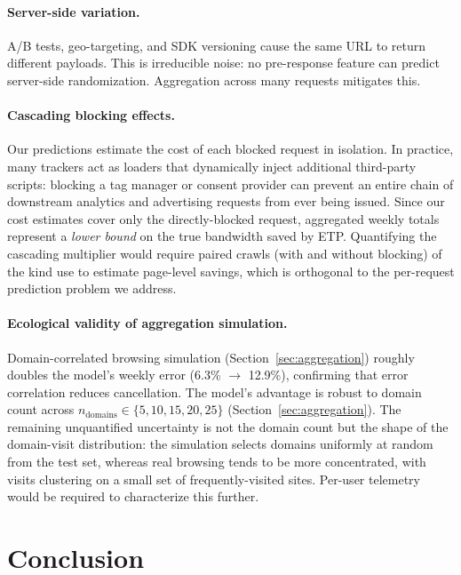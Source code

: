 \documentclass[sigconf,nonacm]{acmart}
\begin{document}
\paragraph{Server-side variation.}
A/B tests, geo-targeting, and SDK versioning cause the same URL to return different payloads.
This is irreducible noise: no pre-response feature can predict server-side randomization.
Aggregation across many requests mitigates this.

\paragraph{Cascading blocking effects.}
Our predictions estimate the cost of each blocked request in isolation.
In practice, many trackers act as loaders that dynamically inject additional third-party scripts: blocking a tag manager or consent provider can prevent an entire chain of downstream analytics and advertising requests from ever being issued.
Since our cost estimates cover only the directly-blocked request, aggregated weekly totals represent a \emph{lower bound} on the true bandwidth saved by ETP.
Quantifying the cascading multiplier would require paired crawls (with and without blocking) of the kind \citet{brave2019savings} use to estimate page-level savings, which is orthogonal to the per-request prediction problem we address.

\paragraph{Ecological validity of aggregation simulation.}
Domain-correlated browsing simulation (Section~\ref{sec:aggregation}) roughly doubles the model's weekly error (6.3\% $\to$ 12.9\%), confirming that error correlation reduces cancellation.
The model's advantage is robust to domain count across $n_{\text{domains}} \in \{5, 10, 15, 20, 25\}$ (Section~\ref{sec:aggregation}).
The remaining unquantified uncertainty is not the domain count but the shape of the domain-visit distribution: the simulation selects domains uniformly at random from the test set, whereas real browsing tends to be more concentrated, with visits clustering on a small set of frequently-visited sites. Per-user telemetry would be required to characterize this further.

\section{Conclusion}
\label{sec:conclusion}
\end{document}
